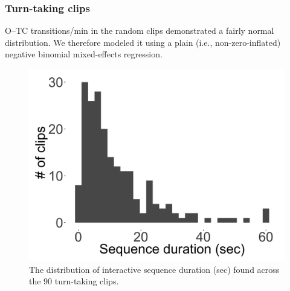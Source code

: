 \documentclass[floatsintext,man]{apa6}
\theoremstyle{definition}
\theoremstyle{definition}
\theoremstyle{definition}
\theoremstyle{remark}
\begin{document}
\FloatBarrier

\subsubsection{Turn-taking clips}\label{models-seqdur-turntaking}

O--TC transitions/min in the random clips demonstrated a fairly normal
distribution. We therefore modeled it using a plain (i.e.,
non-zero-inflated) negative binomial mixed-effects regression.

\FloatBarrier

\begin{figure}[H]

{\centering \includegraphics[width=0.4\linewidth]{www/seqdur_turntaking_distribution} 

}

\caption{The distribution of interactive sequence duration (sec) found across the 90 turn-taking clips.}\label{fig:fig28}
\end{figure}

\FloatBarrier
\end{document}
